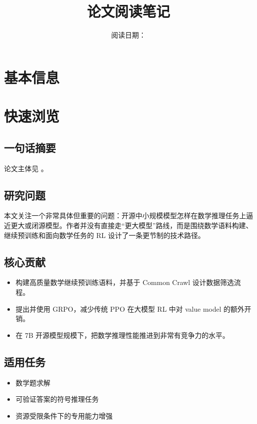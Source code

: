 \documentclass[UTF8,fontset=fandol,zihao=-4]{ctexart}
\title{\papertitle\\\large 论文阅读笔记}
\author{\paperauthors}
\date{阅读日期：\readingdate}
\begin{document}
\maketitle

\section{基本信息}

\RenderBasicInfoTable

\section{快速浏览}

\subsection{一句话摘要}
\paperonesentence 论文主体见 \cite{deepseekai2024math}。

\subsection{研究问题}
本文关注一个非常具体但重要的问题：开源中小规模模型怎样在数学推理任务上逼近更大或闭源模型。作者并没有直接走“更大模型”路线，而是围绕数学语料构建、继续预训练和面向数学任务的 RL 设计了一条更节制的技术路径。

\subsection{核心贡献}
\begin{itemize}
  \item 构建高质量数学继续预训练语料，并基于 Common Crawl 设计数据筛选流程。
  \item 提出并使用 GRPO，减少传统 PPO 在大模型 RL 中对 value model 的额外开销。
  \item 在 7B 开源模型规模下，把数学推理性能推进到非常有竞争力的水平。
\end{itemize}

\subsection{适用任务}
\begin{itemize}
  \item 数学题求解
  \item 可验证答案的符号推理任务
  \item 资源受限条件下的专用能力增强
\end{itemize}
\end{document}
